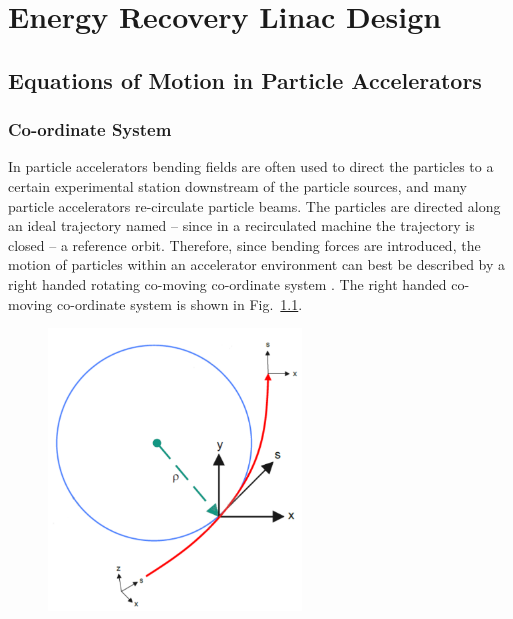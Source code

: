 \documentclass[../main.tex]{subfiles}
\begin{document}
\chapter{Energy Recovery Linac Design}
\label{Energy_Recovery_Linac_Design} %

\section{Equations of Motion in Particle Accelerators}

\subsection{Co-ordinate System}

In particle accelerators bending fields are often used to direct the particles to a certain experimental station downstream of the particle sources, and many particle accelerators re-circulate particle beams. The particles are directed along an ideal trajectory named -- since in a recirculated machine the trajectory is closed -- a reference orbit. Therefore, since bending forces are introduced, the motion of particles within an accelerator environment can best be described by a right handed rotating co-moving co-ordinate system \cite{wille2000physics}. The right handed co-moving co-ordinate system is shown in Fig.~\ref{fig:accelerator_coord_system}.   

\begin{figure}[!h]
\centering
\includegraphics[width=0.6\textwidth]{Figures/Energy_Recovery_Linac_Design/Accelerator_Coord_System_fixed.pdf}
\caption{}
\label{fig:accelerator_coord_system}
\end{figure}
\end{document}
